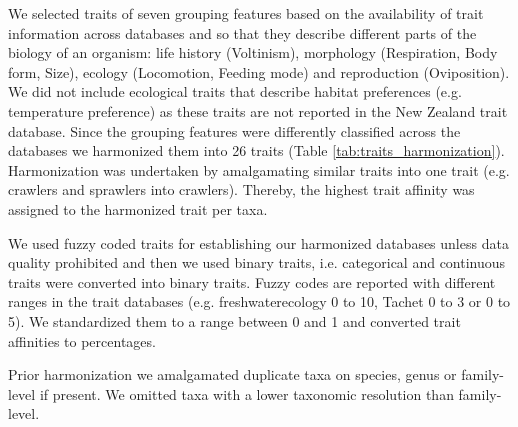 \documentclass{article}
\begin{document}
We selected traits of seven grouping features based on the availability of trait information across databases and so that they describe different parts of the biology of an organism: life history (Voltinism), morphology (Respiration, Body form, Size), ecology (Locomotion, Feeding mode) and reproduction (Oviposition). %
We did not include ecological traits that describe habitat preferences (e.g. temperature preference) as these traits are not reported in the New Zealand trait database. Since the grouping features were differently classified across the databases we harmonized them into 26 traits (Table \ref{tab:traits_harmonization}). Harmonization was undertaken by amalgamating similar traits into one trait (e.g. crawlers and sprawlers into crawlers). Thereby, the highest trait affinity was assigned to the harmonized trait per taxa. 

We used fuzzy coded traits for establishing our harmonized databases unless data quality prohibited and then we used binary traits, i.e. categorical and continuous traits were converted into binary traits. Fuzzy codes are reported with different ranges in the trait databases (e.g. freshwaterecology 0 to 10, Tachet 0 to 3 or 0 to 5). We standardized them to a range between 0 and 1 and converted trait affinities to percentages. 

Prior harmonization we amalgamated duplicate taxa on species, genus or family-level if present. We omitted taxa with a lower taxonomic resolution than family-level.

\end{document}

